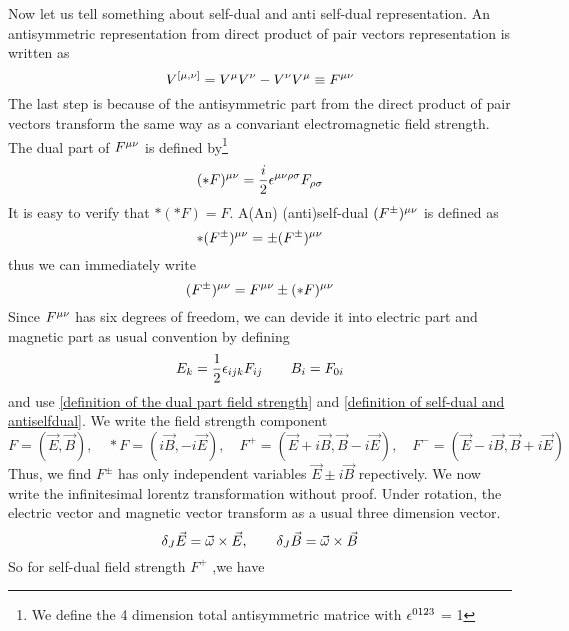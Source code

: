  Now let us tell something about self-dual and anti self-dual representation.
 An antisymmetric representation from direct product of pair vectors representation is written as
 \begin{equation}
    V^{[\mu,\nu]} = V^{\mu}V^{\nu}-V^{\nu}V^{\mu} \equiv F^{\mu\nu}
 \end{equation} 
 The last step is because of the antisymmetric part from the direct product of pair vectors transform the same way as a convariant electromagnetic field strength.
 The dual part of $F^{\mu\nu}$ is defined by\footnote{We define the 4 dimension total antisymmetric matrice with $\epsilon^{0123}$ = 1}
 \begin{equation}\label{definition of the dual part field strength}
   (*F)^{\mu\nu} = \frac{i}{2}\epsilon^{\mu\nu\rho\sigma} F_{\rho\sigma}
 \end{equation}
 It is easy to verify that $*(*F) = F$.
 A(An) (anti)self-dual $(F^{\pm})^{\mu\nu}$ is defined as
 \begin{equation}\label{definition of self-dual and antiselfdual}
   *(F^{\pm})^{\mu\nu} = \pm (F^{\pm})^{\mu\nu}
 \end{equation}  
 thus we can immediately write
 \begin{equation}
    (F^{\pm})^{\mu\nu} = F^{\mu\nu} \pm (*F)^{\mu\nu}
 \end{equation}
 Since $F^{\mu\nu}$ has six degrees of freedom, we can devide it into electric part and magnetic part as usual convention by defining
 \begin{equation}
  E_k =\frac{1}{2} \epsilon_{ijk} F_{ij} \qquad B_i = F_{0i}
 \end{equation}
 and use \eqref{definition of the dual part field strength} and \eqref{definition of self-dual and antiselfdual}. We write the field strength component
 \begin{equation}
   F = (\vec{E},\vec{B}), \quad *F = (i\vec{B},-i\vec{E}), \quad
   F^{+} = ( \vec{E} + i\vec{B} , \vec{B} -i\vec{E}), \quad
   F^{-} = ( \vec{E} - i\vec{B} , \vec{B} +i\vec{E})
   \end{equation}
  Thus, we find $F^{\pm}$ has only independent variables $\vec{E}\pm i \vec{B}$ repectively. We now write the infinitesimal lorentz transformation without proof. Under rotation, the electric vector and magnetic vector transform as a usual three dimension vector.
  \begin{equation}
  \delta_J\vec{E} = \vec{\omega} \times \vec{E},\qquad 
  \delta_J\vec{B} = \vec{\omega} \times \vec{B}
  \end{equation}
  So for self-dual field strength $F^{+}$ ,we have
